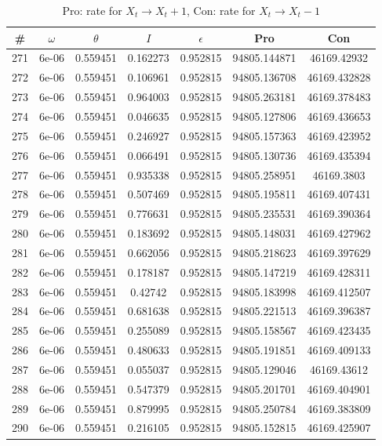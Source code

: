 \newpage
\begin{table}
\caption{Pro: rate for $X_t \rightarrow X_t + 1$, Con: rate for $X_t \rightarrow X_t - 1$}
\begin{tabular*}{\linewidth}{c|c|c|c|c|c|c}
\# & $\omega$ & $\theta$ & $I$ & $\epsilon$ & Pro & Con \\
\hline
271 & 6e-06 & 0.559451 & 0.162273 & 0.952815 & 94805.144871 & 46169.42932\\
272 & 6e-06 & 0.559451 & 0.106961 & 0.952815 & 94805.136708 & 46169.432828\\
273 & 6e-06 & 0.559451 & 0.964003 & 0.952815 & 94805.263181 & 46169.378483\\
274 & 6e-06 & 0.559451 & 0.046635 & 0.952815 & 94805.127806 & 46169.436653\\
275 & 6e-06 & 0.559451 & 0.246927 & 0.952815 & 94805.157363 & 46169.423952\\
276 & 6e-06 & 0.559451 & 0.066491 & 0.952815 & 94805.130736 & 46169.435394\\
277 & 6e-06 & 0.559451 & 0.935338 & 0.952815 & 94805.258951 & 46169.3803\\
278 & 6e-06 & 0.559451 & 0.507469 & 0.952815 & 94805.195811 & 46169.407431\\
279 & 6e-06 & 0.559451 & 0.776631 & 0.952815 & 94805.235531 & 46169.390364\\
280 & 6e-06 & 0.559451 & 0.183692 & 0.952815 & 94805.148031 & 46169.427962\\
281 & 6e-06 & 0.559451 & 0.662056 & 0.952815 & 94805.218623 & 46169.397629\\
282 & 6e-06 & 0.559451 & 0.178187 & 0.952815 & 94805.147219 & 46169.428311\\
283 & 6e-06 & 0.559451 & 0.42742 & 0.952815 & 94805.183998 & 46169.412507\\
284 & 6e-06 & 0.559451 & 0.681638 & 0.952815 & 94805.221513 & 46169.396387\\
285 & 6e-06 & 0.559451 & 0.255089 & 0.952815 & 94805.158567 & 46169.423435\\
286 & 6e-06 & 0.559451 & 0.480633 & 0.952815 & 94805.191851 & 46169.409133\\
287 & 6e-06 & 0.559451 & 0.055037 & 0.952815 & 94805.129046 & 46169.43612\\
288 & 6e-06 & 0.559451 & 0.547379 & 0.952815 & 94805.201701 & 46169.404901\\
289 & 6e-06 & 0.559451 & 0.879995 & 0.952815 & 94805.250784 & 46169.383809\\
290 & 6e-06 & 0.559451 & 0.216105 & 0.952815 & 94805.152815 & 46169.425907\\

\end{tabular*}
\end{table}
